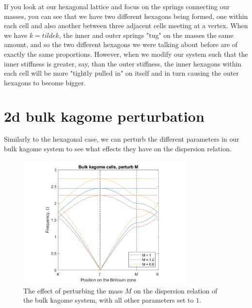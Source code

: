 If you look at our hexagonal lattice and focus on the springs connecting our
masses, you can see that we have two different hexagons being formed, one
within each cell and also another between three adjacent cells meeting at a
vertex. When we have $k=tilde{k}$, the inner and outer springs "tug" on the
masses the same amount, and so the two different hexagons we were talking about
before are of exactly the same proportions. However, when we modify our system
such that the inner stiffness is greater, say, than the outer stiffness, the
inner hexagons within each cell will be more "tightly pulled in" on itself and
in turn causing the outer hexagons to become bigger.


\section{2d bulk kagome perturbation}
Similarly to the hexagonal case, we can perturb the different parameters in our
bulk kagome system to see what effects they have on the dispersion relation.

\begin{figure}[!h]
\centering
\includegraphics[width=0.8\textwidth]{imgs/kagomeperturbM.png}
\caption{\label{fig:kagomeM} The effect of perturbing the mass $M$ on the
  dispersion relation of the bulk kagome system, with all other parameters set
  to $1$.}
\end{figure}

